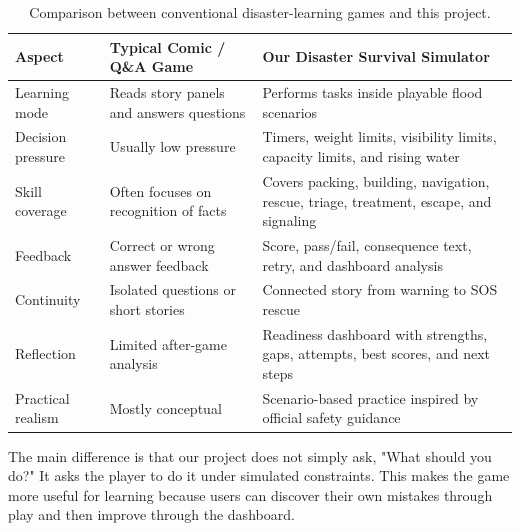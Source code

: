\documentclass[11pt,a4paper]{article}
\begin{document}
\begin{table}[h]
\centering
\small
\begin{tabularx}{\textwidth}{L{0.27\textwidth}Y Y}
\toprule
\textbf{Aspect} & \textbf{Typical Comic / Q\&A Game} & \textbf{Our Disaster Survival Simulator} \\
\midrule
Learning mode & Reads story panels and answers questions & Performs tasks inside playable flood scenarios \\
Decision pressure & Usually low pressure & Timers, weight limits, visibility limits, capacity limits, and rising water \\
Skill coverage & Often focuses on recognition of facts & Covers packing, building, navigation, rescue, triage, treatment, escape, and signaling \\
Feedback & Correct or wrong answer feedback & Score, pass/fail, consequence text, retry, and dashboard analysis \\
Continuity & Isolated questions or short stories & Connected story from warning to SOS rescue \\
Reflection & Limited after-game analysis & Readiness dashboard with strengths, gaps, attempts, best scores, and next steps \\
Practical realism & Mostly conceptual & Scenario-based practice inspired by official safety guidance \\
\bottomrule
\end{tabularx}
\caption{Comparison between conventional disaster-learning games and this project.}
\end{table}

The main difference is that our project does not simply ask, "What should you do?" It asks the player to do it under simulated constraints. This makes the game more useful for learning because users can discover their own mistakes through play and then improve through the dashboard.
\end{document}
